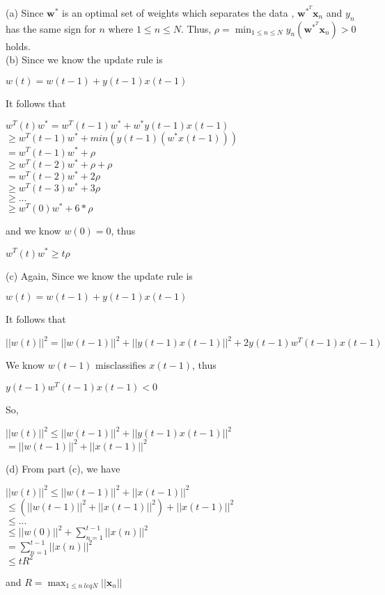 \documentclass[12pt]{article}
\begin{document}
 \\\\
\indent (a) Since $\textbf{w}^*$ is an optimal set of weights which separates the data , $\textbf{w}^{*^{T}}\textbf{x}_n$ and $y_n$ has the same sign for $n$ where $1\leq n \leq N $. Thus, $\displaystyle\rho = \min_{1\leq n\leq N}y_n(\textbf{w}^{*^{T}}\textbf{x}_n) > 0$ holds.\\
\indent (b) Since we know the update rule is 
\begin{center} $w(t) = w(t-1) + y(t-1)x(t-1)$\end{center} It follows that \begin{center} $w^T(t)w^*= w^T(t-1)w^* + w^*y(t-1)x(t-1)$\\$\geq w^T(t-1)w^* + min(y(t-1)(w^*x(t-1)))$\\$=w^T(t-1)w^* + \rho$\\$\geq w^T(t-2)w^* + \rho + \rho$ \\ $=w^T(t-2)w^* + 2\rho$\\ $\geq w^T(t-3)w^* + 3\rho $ \\ $\geq ...$ \\$\geq w^T(0)w^* + 6*\rho$\end{center} and we know $w(0) = 0$, thus \begin{center} $w^T(t)w^* \geq t\rho$\end{center}
\indent (c) Again, Since we know the update rule is 
\begin{center} $w(t) = w(t-1) + y(t-1)x(t-1)$\end{center} It follows that \begin{center} $||w(t)||^2 = ||w(t-1)||^2 + ||y(t-1)x(t-1)||^2 + 2y(t-1)w^T(t-1)x(t-1)$\end{center} We know $w(t-1)$ misclassifies $x(t-1)$, thus \begin{center} $y(t-1)w^T(t-1)x(t-1) < 0$\end{center}So, \begin{center} $||w(t)||^2 \leq ||w(t-1)||^2 + ||y(t-1)x(t-1)||^2 $ \\ $=||w(t-1)||^2 + ||x(t-1)||^2$ \end{center}
\indent (d) From part (c), we have  \begin{center} $||w(t)||^2 \leq ||w(t-1)||^2 + ||x(t-1)||^2$ \\ $\leq (||w(t-1)||^2 + ||x(t-1)||^2) + ||x(t-1)||^2$ \\ $\leq ... $ \\ $\leq ||w(0)||^2 + \sum_{n=1}^{t-1}||x(n)||^2$ \\ $=\sum_{n=1}^{t-1}||x(n)||^2$ \\ $\leq tR^2$\end{center} and $R = \max_{1\leq n\ leq N}||\textbf{x}_n||$\\\\
\end{document}
